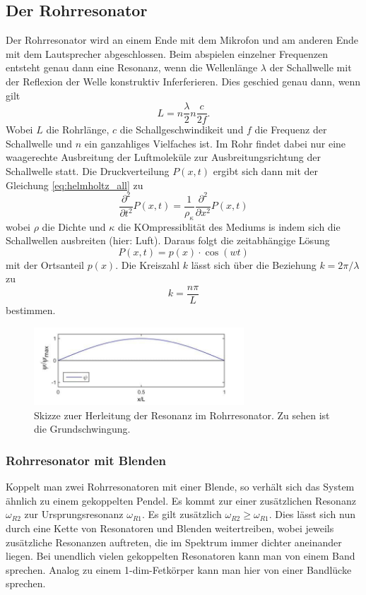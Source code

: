 \subsection{Der Rohrresonator}
Der Rohrresonator wird an einem Ende mit dem Mikrofon und am anderen Ende mit dem Lautsprecher abgeschlossen.
Beim abspielen einzelner Frequenzen entsteht genau dann eine Resonanz, wenn die Wellenlänge $\lambda$ der Schallwelle
mit der Reflexion der Welle konstruktiv Inferferieren. Dies geschied genau dann, wenn gilt
\begin{equation}
    L=n\frac{\lambda}{2}n\frac{c}{2f}.
\end{equation}
Wobei $L$ die Rohrlänge, $c$ die Schallgeschwindikeit und $f$ die Frequenz der Schallwelle und $n$ ein ganzahliges Vielfaches ist.
Im Rohr findet dabei nur eine waagerechte Ausbreitung der Luftmoleküle zur Ausbreitungsrichtung der Schallwelle statt.
Die Druckverteilung $P(x,t)$ ergibt sich dann mit der Gleichung \ref{eq:helmholtz_all} zu
\begin{equation}
    \frac{\partial^2}{\partial t^2}P(x,t)=\frac{1}{\rho_\kappa}\frac{\partial^2}{\partial x^2}P(x,t)
\end{equation}
\label{sec:Theorie}
wobei $\rho$ die Dichte und $\kappa$ die KOmpressiblität des Mediums is indem sich die Schallwellen ausbreiten (hier: Luft).
Daraus folgt die zeitabhängige Lösung
\begin{equation}
    P(x,t)=p(x)\cdot \cos{(wt)}
    \label{eq:rohr_loe}
\end{equation}
mit der Ortsanteil $p(x)$.
Die Kreiszahl $k$ lässt sich über die Beziehung $k=2\pi/\lambda$ zu
\begin{equation}
    k=\frac{n\pi}{L}
\end{equation}
bestimmen.

\begin{figure}
    \center
    \includegraphics[width=0.7\textwidth]{bilder/Resonanz.jpg}
    \caption{Skizze zuer Herleitung der Resonanz im Rohrresonator. Zu sehen ist die Grundschwingung. \cite{uni}}
\end{figure}

\subsubsection{Rohrresonator mit Blenden}
Koppelt man zwei Rohrresonatoren mit einer Blende, so verhält sich das System ähnlich zu einem 
gekoppelten Pendel. Es kommt zur einer zusätzlichen Resonanz $\omega_{R2}$ zur Ursprungsresonanz $\omega_{R1}$.
Es gilt zusätzlich $\omega_{R2}\geq \omega_{R1}$. Dies lässt sich nun durch eine Kette von Resonatoren und Blenden weitertreiben, wobei
jeweils zusätzliche Resonanzen auftreten, die im Spektrum immer dichter aneinander liegen.
Bei unendlich vielen gekoppelten Resonatoren kann man von einem Band sprechen.
Analog zu einem 1-dim-Fetkörper kann man hier von einer Bandlücke sprechen.

